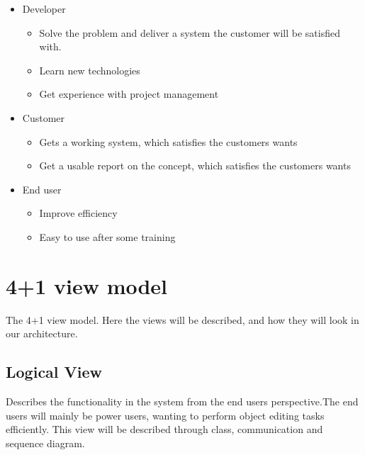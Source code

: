 \begin{itemize}
    \item Developer
    \begin{itemize}
        \item Solve the problem and deliver a system the customer will be satisfied with.
        \item Learn new technologies
        \item Get experience with project management
        \end{itemize}
    \item Customer
    \begin{itemize}
        \item Gets a working system, which satisfies the customers wants
        \item Get a usable report on the concept, which satisfies the customers wants
    \end{itemize}
    \item End user
    \begin{itemize}
        \item Improve efficiency
        \item Easy to use after some training
    \end{itemize}
\end{itemize}



\section{4+1 view model}
The 4+1 view model. Here the views will be described, and how they will look in our architecture. 

\subsection{Logical View}
Describes the functionality in the system from the end users perspective.The end users will mainly be power users, wanting to perform object editing tasks efficiently. This view will be described through class, communication and sequence diagram.

